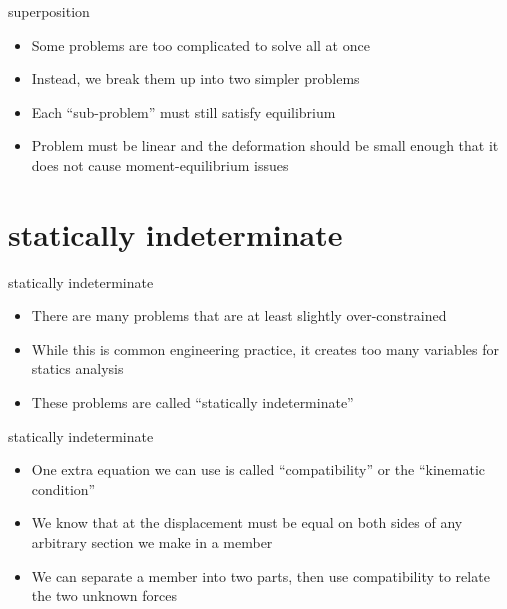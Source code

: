 \documentclass[
  letterpaper,
  ignorenonframetext,
  aspectratio=43,
  handout,
  12pt]{beamer}
\providecommand{\tightlist}{%
  \setlength{\itemsep}{0pt}\setlength{\parskip}{0pt}}
\providecommand{\tightlist}{%
\setlength{\itemsep}{0pt}\setlength{\parskip}{0pt}}
\begin{document}
\begin{frame}{superposition}
\protect\hypertarget{superposition-1}{}
\begin{itemize}
\tightlist
\item
  Some problems are too complicated to solve all at once
\item
  Instead, we break them up into two simpler problems
\item
  Each ``sub-problem'' must still satisfy equilibrium
\item
  Problem must be linear and the deformation should be small enough that
  it does not cause moment-equilibrium issues
\end{itemize}
\end{frame}

\hypertarget{statically-indeterminate}{%
\section{statically indeterminate}\label{statically-indeterminate}}

\begin{frame}{statically indeterminate}
\protect\hypertarget{statically-indeterminate-1}{}
\begin{itemize}
\tightlist
\item
  There are many problems that are at least slightly over-constrained
\item
  While this is common engineering practice, it creates too many
  variables for statics analysis
\item
  These problems are called ``statically indeterminate''
\end{itemize}
\end{frame}

\begin{frame}{statically indeterminate}
\protect\hypertarget{statically-indeterminate-2}{}
\begin{itemize}
\tightlist
\item
  One extra equation we can use is called ``compatibility'' or the
  ``kinematic condition''
\item
  We know that at the displacement must be equal on both sides of any
  arbitrary section we make in a member
\item
  We can separate a member into two parts, then use compatibility to
  relate the two unknown forces
\end{itemize}
\end{frame}
\end{document}
